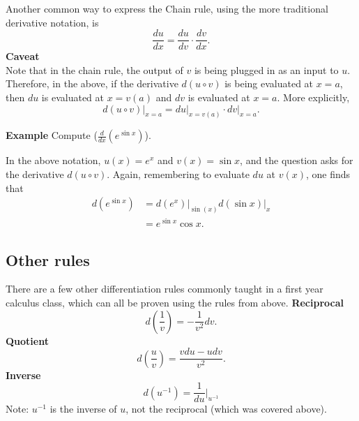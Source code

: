 \documentclass[twoside,openright,titlepage,a4paper]{book}
\begin{document}
\begin{sloppypar}
Another common way to express the Chain rule, using the more traditional derivative notation, is
\begin{equation*}
\frac{du}{dx} = \frac{du}{dv}\cdot \frac{dv}{dx}.
\end{equation*}
\bigbreak
\textbf{Caveat}\\

Note that in the chain rule, the output of $v$ is being plugged in as an input to $u$. Therefore, in the above, if the derivative $d(u \circ v)$ is being evaluated at $x=a$, then $du$ is evaluated at $x=v(a)$ and $dv$ is evaluated at $x=a$. More explicitly, \[ d(u \circ v) \bigg|_{x=a} = du \bigg|_{x=v(a)} \cdot dv \bigg|_{x=a}. \]

\textbf{Example} Compute ($ \frac{d}{dx}\left(e^{\sin x}\right)$).
\begin{examplebox}
In the above notation, $u(x) = e^x$ and $v(x) = \sin x$, and the question asks for the derivative $d(u \circ v)$. Again, remembering to evaluate $du$ at $v(x)$, one finds that
\begin{align*} 
d\left(e^{\sin x}\right) &= d(e^x) \bigg|_{\sin(x)} d(\sin x)\bigg|_{x} \\
&= e^{\sin x} \cos x. 
\end{align*}
\end{examplebox}

\subsection{Other rules}
There are a few other differentiation rules commonly taught in a first year calculus class, which can all be proven using the rules from above.
\bigbreak
\textbf{Reciprocal}\\
\[ d \left(\frac{1}{v}\right) = - \frac{1}{v^2} dv. \] 
\bigbreak
\textbf{Quotient}\\
 \[ d \left(\frac{u}{v}\right) = \frac{vdu - udv}{v^2}. \]
\bigbreak
\textbf{Inverse}\\
\[ d (u^{-1} ) = \frac{1}{du} \bigg|_{u^{-1}} \] 
Note: $u^{-1}$ is the inverse of $u$, not the reciprocal (which was covered above).


\end{sloppypar}
\end{document}
